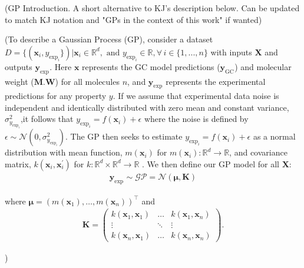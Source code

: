 \documentclass[journal=jacsat,manuscript=article]{achemso}
\newcommand{\mcnote}[1]{{\color{purple} (#1)}}
\newcommand{\xvec}{\ensuremath{\mathbf{x}}}
\newcommand{\Ygcvec}[1][]{\ensuremath{\mathbf{y}_{\text{GC}_{#1}}}}
\newcommand{\yexpvec}[1][]{\ensuremath{\mathbf{y}_{\text{exp}_{#1}}}}
\newcommand{\yexp}[1][]{\ensuremath{y_{\text{exp}_{#1}}}}
\begin{document}
\mcnote{GP Introduction. A short alternative to KJ's description below. Can be updated to match KJ notation and "GPs in the context of this work" if wanted}

\mcnote{To describe a Gaussian Process (GP), consider a dataset $D = \{(\xvec_i, \yexp[i]\}) \vert \xvec_i \in \mathbb{R}^d, \text{ and } \yexp[i] \in \mathbb{R}, \forall \, i \in \{1,. . ., n\}$ with inputs $\mathbf{X}$ and outputs $\yexpvec[]$. Here $\xvec$ represents the GC model predictions ($\Ygcvec$) and molecular weight ($\textbf{M.W}$) for all molecules $n$, and $\yexpvec$ represents the experimental predictions for any property $y$. If we assume that experimental data noise is independent and identically distributed with zero mean and constant variance, $\sigma_{\yexp[i]}^2$,it follows that $\yexp[i] = f(\xvec_i) + \epsilon$ where the noise is defined by $\epsilon \sim \mathcal{N}(0,\sigma_{\yexp[i]}^2)$. The GP then seeks to estimate $\yexp[i] = f(\xvec_i) + \epsilon$ as a normal distribution with mean function, $m(\xvec_i)$ for $m(\xvec_i): \mathbb{R}^d \rightarrow \mathbb{R}$, and covariance matrix, $k(\xvec_i, \xvec_i^{\prime})$ for $k: \mathbb{R}^d \times \mathbb{R}^d \rightarrow \mathbb{R}$ \cite{Frazier2018AOptimization}. We then define our GP model for all $\mathbf{X}$:
\begin{gather*}
     \yexpvec \sim \mathcal{GP} = \mathcal{N}(\boldsymbol{\mu}, \mathbf{K})
\end{gather*}

\noindent where $\boldsymbol{\mu} = (m(\xvec_1), \dots, m(\xvec_n))^\intercal$ and
\begin{gather}
    \mathbf{K}= 
    \left(
    \begin{matrix}
        k(\xvec_1,\xvec_1) & \dots & k(\xvec_1,\xvec_n) \\
        \vdots & \ddots & \vdots \\
        k(\xvec_n,\xvec_1) & \dots & k(\xvec_n,\xvec_n)
    \end{matrix}\right).
\end{gather}

}
\end{document}
